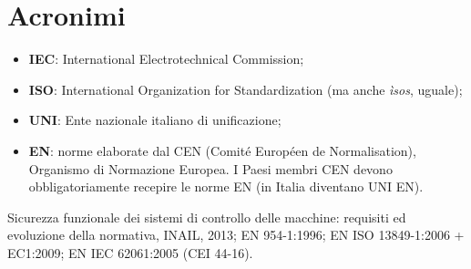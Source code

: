 \section{Acronimi}
\begin{itemize}
    \item \textbf{IEC}: International Electrotechnical Commission;
    \item \textbf{ISO}: International Organization for Standardization (ma anche \emph{ìsos}, uguale);
    \item \textbf{UNI}: Ente nazionale italiano di unificazione;
    \item \textbf{EN}: norme elaborate dal CEN (Comité Européen de Normalisation), Organismo di Normazione Europea. I Paesi membri CEN devono obbligatoriamente recepire le norme EN (in Italia diventano UNI EN).
\end{itemize}

\begin{note}[Bibliografia]
Sicurezza funzionale dei sistemi di controllo delle macchine: requisiti ed evoluzione della normativa, INAIL, 2013; EN 954-1:1996; EN ISO 13849-1:2006 + EC1:2009; EN IEC 62061:2005 (CEI 44-16).
\end{note}
